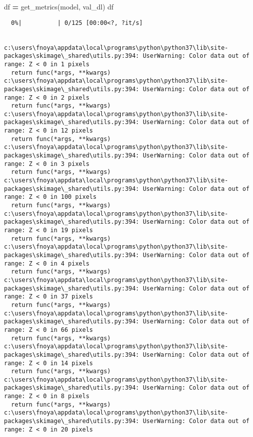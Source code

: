 \documentclass[
]{article}
\newenvironment{Shaded}{\begin{snugshade}}{\end{snugshade}}
\newcommand{\NormalTok}[1]{#1}
\newcommand{\OperatorTok}[1]{\textcolor[rgb]{0.81,0.36,0.00}{\textbf{#1}}}
\begin{document}
\begin{Shaded}
\begin{Highlighting}[]
\NormalTok{df }\OperatorTok{=}\NormalTok{ get\_metrics(model, val\_dl)}
\NormalTok{df}
\end{Highlighting}
\end{Shaded}

\begin{verbatim}
  0%|          | 0/125 [00:00<?, ?it/s]


c:\users\fnoya\appdata\local\programs\python\python37\lib\site-packages\skimage\_shared\utils.py:394: UserWarning: Color data out of range: Z < 0 in 1 pixels
  return func(*args, **kwargs)
c:\users\fnoya\appdata\local\programs\python\python37\lib\site-packages\skimage\_shared\utils.py:394: UserWarning: Color data out of range: Z < 0 in 2 pixels
  return func(*args, **kwargs)
c:\users\fnoya\appdata\local\programs\python\python37\lib\site-packages\skimage\_shared\utils.py:394: UserWarning: Color data out of range: Z < 0 in 12 pixels
  return func(*args, **kwargs)
c:\users\fnoya\appdata\local\programs\python\python37\lib\site-packages\skimage\_shared\utils.py:394: UserWarning: Color data out of range: Z < 0 in 3 pixels
  return func(*args, **kwargs)
c:\users\fnoya\appdata\local\programs\python\python37\lib\site-packages\skimage\_shared\utils.py:394: UserWarning: Color data out of range: Z < 0 in 100 pixels
  return func(*args, **kwargs)
c:\users\fnoya\appdata\local\programs\python\python37\lib\site-packages\skimage\_shared\utils.py:394: UserWarning: Color data out of range: Z < 0 in 19 pixels
  return func(*args, **kwargs)
c:\users\fnoya\appdata\local\programs\python\python37\lib\site-packages\skimage\_shared\utils.py:394: UserWarning: Color data out of range: Z < 0 in 4 pixels
  return func(*args, **kwargs)
c:\users\fnoya\appdata\local\programs\python\python37\lib\site-packages\skimage\_shared\utils.py:394: UserWarning: Color data out of range: Z < 0 in 37 pixels
  return func(*args, **kwargs)
c:\users\fnoya\appdata\local\programs\python\python37\lib\site-packages\skimage\_shared\utils.py:394: UserWarning: Color data out of range: Z < 0 in 66 pixels
  return func(*args, **kwargs)
c:\users\fnoya\appdata\local\programs\python\python37\lib\site-packages\skimage\_shared\utils.py:394: UserWarning: Color data out of range: Z < 0 in 14 pixels
  return func(*args, **kwargs)
c:\users\fnoya\appdata\local\programs\python\python37\lib\site-packages\skimage\_shared\utils.py:394: UserWarning: Color data out of range: Z < 0 in 8 pixels
  return func(*args, **kwargs)
c:\users\fnoya\appdata\local\programs\python\python37\lib\site-packages\skimage\_shared\utils.py:394: UserWarning: Color data out of range: Z < 0 in 20 pixels

\end{verbatim}
\end{document}
